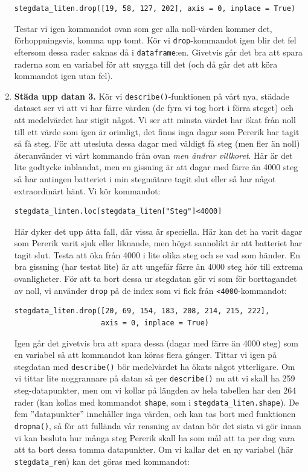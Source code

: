 \documentclass{article}
\begin{document}
\begin{enumerate}
\begin{verbatim}
stegdata_liten.drop([19, 58, 127, 202], axis = 0, inplace = True)
\end{verbatim}
Testar vi igen kommandot ovan som ger alla noll-värden kommer det, förhoppningsvis, komma upp tomt. Kör vi \verb+drop+-kommandot igen blir det fel eftersom dessa rader saknas då i \verb+dataframe+:en. Givetvis går det bra att spara raderna som en variabel för att snygga till det (och då går det att köra kommandot igen utan fel). 
\item \textbf{Städa upp datan 3.} Kör vi \verb+describe()+-funktionen på vårt nya, städade dataset ser vi att vi har färre värden (de fyra vi tog bort i förra steget) och att medelvärdet har stigit något. Vi ser att minsta värdet har ökat från noll till ett värde som igen är orimligt, det finns inga dagar som Pererik har tagit så få steg. För att utesluta dessa dagar med väldigt få steg (men fler än noll) återanvänder vi vårt kommando från ovan \emph{men ändrar villkoret}. Här är det lite godtycke inblandat, men en gissning är att dagar med färre än 4000 steg så har antingen batteriet i min stegmätare tagit slut eller så har något extraordinärt hänt. Vi kör kommandot:
\begin{verbatim}
stegdata_linten.loc[stegdata_liten["Steg"]<4000]    
\end{verbatim}
Här dyker det upp åtta fall, där vissa är speciella. Här kan det ha varit dagar som Pererik varit sjuk eller liknande, men högst sannolikt är att batteriet har tagit slut. Testa att öka från 4000 i lite olika steg och se vad som händer. En bra gissning (har testat lite) är att ungefär färre än 4000 steg hör till extrema ovanligheter. För att ta bort dessa ur stegdatan gör vi som för borttagandet av noll, vi använder \verb+drop+ på de index som vi fick från \verb+<4000+-kommandot:
\begin{verbatim}
stegdata_liten.drop([20, 69, 154, 183, 208, 214, 215, 222], 
                    axis = 0, inplace = True)
\end{verbatim}
Igen går det givetvis bra att spara dessa (dagar med färre än 4000 steg) som en variabel så att kommandot kan köras flera gånger. Tittar vi igen på stegdatan med \verb+describe()+ bör medelvärdet ha ökats något ytterligare. Om vi tittar lite noggrannare på datan så ger \verb+describe()+ nu att vi skall ha 259 steg-datapunkter, men om vi kollar på längden av hela tabellen har den 264 rader (kan kollas med kommandot \verb+shape+, som i \texttt{stegdata_liten.shape}). De fem ”datapunkter” innehåller inga värden, och kan tas bort med funktionen \verb+dropna()+, så för att fullända vår rensning av datan bör det sista vi gör innan vi kan besluta hur många steg Pererik skall ha som mål att ta per dag vara att ta bort dessa tomma datapunkter. Om vi kallar det en ny variabel (här \verb+stegdata_ren+) kan det göras med kommandot:

\end{enumerate}
\end{document}
